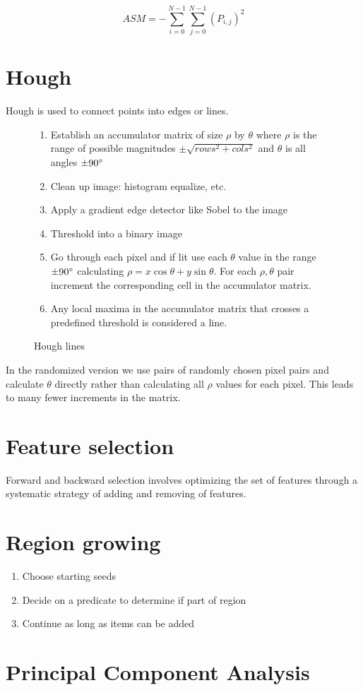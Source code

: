 \documentclass[11pt]{report}
\begin{document}
\begin{equation}
	ASM = -\sum_{i=0}^{N-1}\sum_{j=0}^{N-1}(P_{i,j})^2
\end{equation}

\section*{Hough}
Hough is used to connect points into edges or lines. 

\begin{figure}[!htb]
	\begin{enumerate}
		\item Establish an accumulator matrix of size $\rho$ by $\theta$ where $\rho$ is the range of possible magnitudes $\pm\sqrt{rows^2 + cols^2}$ and $\theta$ is all angles $\pm90\degree$
		\item Clean up image: histogram equalize, etc.
		\item Apply a gradient edge detector like Sobel to the image
		\item Threshold into a binary image
		\item Go through each pixel and if lit use each $\theta$ value in the range $\pm90\degree$ calculating $\rho = x \cos \theta + y \sin \theta$. For each $\rho, \theta$ pair increment the corresponding cell in the accumulator matrix.
		\item Any local maxima in the accumulator matrix that crosses a predefined threshold is considered a line.
	\end{enumerate}
	\caption{Hough lines}
\end{figure}

In the randomized version we use pairs of randomly chosen pixel pairs and calculate $\theta$ directly rather than calculating all $\rho$ values for each pixel. This leads to many fewer increments in the matrix.

\section*{Feature selection}
Forward and backward selection involves optimizing the set of features through a systematic strategy of adding and removing of features.

\section*{Region growing}
\begin{enumerate}
	\item Choose starting seeds
	\item Decide on a predicate to determine if part of region
	\item Continue as long as items can be added
\end{enumerate}

\section*{Principal Component Analysis}
\end{document}
